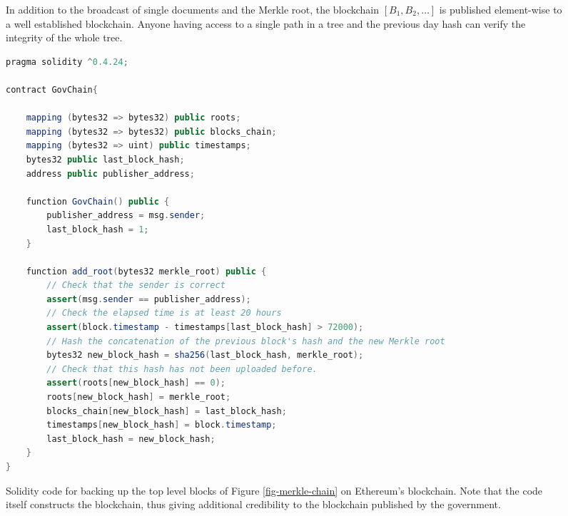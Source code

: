 \begin{figure}
\caption{In addition to the broadcast of single documents and the Merkle root, the blockchain $[B_1,B_2,\dots]$ is published element-wise to a well established blockchain. Anyone having access to a single path in a tree and the previous day hash can verify the integrity of the whole tree.}
\label{fig-merkle-blockchain}
\end{figure}

\lstset{basicstyle=\footnotesize}
\lstset{
  numbers=left,
  stepnumber=1,    
  firstnumber=1,
  numberfirstline=true
}
\begin{figure*}
\begin{lstlisting}[language=java]
pragma solidity ^0.4.24;

contract GovChain{

    mapping (bytes32 => bytes32) public roots;
    mapping (bytes32 => bytes32) public blocks_chain;
    mapping (bytes32 => uint) public timestamps;
    bytes32 public last_block_hash;
    address public publisher_address;

    function GovChain() public {
        publisher_address = msg.sender;
        last_block_hash = 1;
    }

    function add_root(bytes32 merkle_root) public {
        // Check that the sender is correct
        assert(msg.sender == publisher_address);
        // Check the elapsed time is at least 20 hours
        assert(block.timestamp - timestamps[last_block_hash] > 72000);        
        // Hash the concatenation of the previous block's hash and the new Merkle root
        bytes32 new_block_hash = sha256(last_block_hash, merkle_root);
        // Check that this hash has not been uploaded before.
        assert(roots[new_block_hash] == 0);
        roots[new_block_hash] = merkle_root;
        blocks_chain[new_block_hash] = last_block_hash;
        timestamps[new_block_hash] = block.timestamp;
        last_block_hash = new_block_hash;
    }
}

\end{lstlisting}
\caption{Solidity code for backing up the top level blocks of Figure \ref{fig-merkle-chain} on Ethereum's blockchain. Note that the code itself constructs the blockchain, thus giving additional credibility to the blockchain published by the government.}
\label{contract}
\end{figure*}

